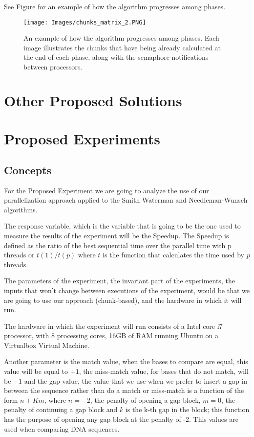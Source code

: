 \documentclass[journal]{IEEEtran}
\begin{document}
See Figure for an example of how the algorithm progresses among phases.

\begin{figure}[h]
  \begin{center}
    \texttt{[image: Images/chunks\_matrix\_2.PNG]}
  \end{center}
  \caption{An example of how the algorithm progresses among phases. Each image illustrates the chunks that have being already calculated at the end of each phase, along with the semaphore notifications between processors.}
  \label{exec}
\end{figure}

\section{Other Proposed Solutions}



\section{Proposed Experiments}


\subsection{Concepts}

For the Proposed Experiment we are going to analyze the use of our parallelization approach applied to the Smith Waterman and Needleman-Wunsch algorithms.

The response variable, which is the variable that is going to be the one used to measure the results of the experiment will be the Speedup. The Speedup is defined as the ratio of the best sequential time over the parallel time with p threads or $t(1)/t(p)$ where $t$ is the function that calculates the time used by $p$ threads.

The parameters of the experiment, the invariant part of the experiments, the inputs that won't change between executions of the experiment, would be that we are going to use our approach (chunk-based), and the hardware in which it will run.

The hardware in which the experiment will run consists of a Intel core i7 processor, with 8 processing cores, 16GB of RAM running Ubuntu on a Virtualbox Virtual Machine.

Another parameter is the match value, when the bases to compare are equal, this value will be equal to $+1$, the miss-match value, for bases that do not match, will be $-1$ and the gap value, the value that we use when we prefer to insert a gap in between the sequence rather than do a match or miss-match is a function of the form $n + Km$, where $n = -2$, the penalty of opening a gap block, $m = 0$, the penalty of continuing a gap block and $k$ is the k-th gap in the block; this function has the purpose of opening any gap block at the penalty of -2. This values are used when comparing DNA sequences.
\end{document}
